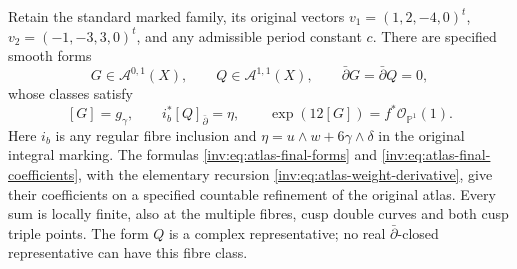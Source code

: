 \begin{proposition}
\label{inv:C3.8}
Retain the standard marked family, its original vectors
$v_1=(1,2,-4,0)^t$, $v_2=(-1,-3,3,0)^t$, and any admissible period
constant $c$.  There are specified smooth forms
\[
 G\in\mathcal A^{0,1}(X),\qquad Q\in\mathcal A^{1,1}(X),
 \qquad \bar\partial G=\bar\partial Q=0,
\]
whose classes satisfy
\[
 [G]=g_\gamma,\qquad
 i_b^*[Q]_{\bar\partial}=\eta,\qquad
 \exp(12[G])=f^*\mathcal O_{\mathbb P^1}(1).
\]
Here $i_b$ is any regular fibre inclusion and
$\eta=u\wedge w+6\gamma\wedge\delta$ in the original integral marking.
The formulas \eqref{inv:eq:atlas-final-forms} and
\eqref{inv:eq:atlas-final-coefficients}, with the elementary recursion
\eqref{inv:eq:atlas-weight-derivative}, give their coefficients on a
specified countable refinement of the original atlas.  Every sum is
locally finite, also at the multiple fibres, cusp double curves and
both cusp triple points.  The form $Q$ is a complex representative;
no real $\bar\partial$-closed representative can have this fibre class.
\end{proposition}

